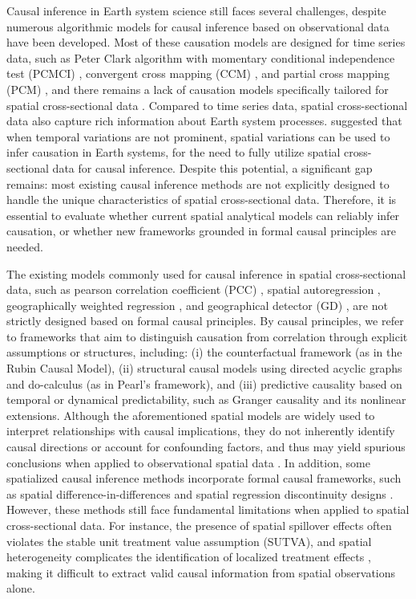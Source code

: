\documentclass[authoryear,preprint,review,12pt]{elsarticle}
\begin{document}
Causal inference in Earth system science still faces several challenges, despite numerous algorithmic models for causal inference based on observational data have been developed. Most of these causation models are designed for time series data, such as Peter Clark algorithm with momentary conditional independence test (PCMCI) \citep{runge2019pcmci}, convergent cross mapping (CCM) \citep{sugihara2012ccm}, and partial cross mapping (PCM) \citep{leng2020pcm}, and there remains a lack of causation models specifically tailored for spatial cross-sectional data \citep{gao2022ciss,gao2023gccm}. Compared to time series data, spatial cross-sectional data also capture rich information about Earth system processes. \cite{gao2022tscess} suggested that when temporal variations are not prominent, spatial variations can be used to infer causation in Earth systems, for the need to fully utilize spatial cross-sectional data for causal inference. Despite this potential, a significant gap remains: most existing causal inference methods are not explicitly designed to handle the unique characteristics of spatial cross-sectional data. Therefore, it is essential to evaluate whether current spatial analytical models can reliably infer causation, or whether new frameworks grounded in formal causal principles are needed.

The existing models commonly used for causal inference in spatial cross-sectional data, such as pearson correlation coefficient (PCC) \citep{pearson1895pcc}, spatial autoregression \citep{anselin2013sar}, geographically weighted regression \citep{fotheringham2003gwr,fotheringham2017mgwr}, and geographical detector (GD) \citep{wang2010gd1,lyu2025gdverse}, are not strictly designed based on formal causal principles. By causal principles, we refer to frameworks that aim to distinguish causation from correlation through explicit assumptions or structures, including: (i) the counterfactual framework (as in the Rubin Causal Model), (ii) structural causal models using directed acyclic graphs and do-calculus (as in Pearl’s framework), and (iii) predictive causality based on temporal or dynamical predictability, such as Granger causality and its nonlinear extensions. Although the aforementioned spatial models are widely used to interpret relationships with causal implications, they do not inherently identify causal directions or account for confounding factors, and thus may yield spurious conclusions when applied to observational spatial data \citep{gao2022ciss}. In addition, some spatialized causal inference methods incorporate formal causal frameworks, such as spatial difference-in-differences \citep{delgado2015sdid} and spatial regression discontinuity designs \citep{kolak2019srdd}. However, these methods still face fundamental limitations when applied to spatial cross-sectional data. For instance, the presence of spatial spillover effects often violates the stable unit treatment value assumption (SUTVA), and spatial heterogeneity complicates the identification of localized treatment effects \citep{akbari2021spatialcausality,gao2023gccm}, making it difficult to extract valid causal information from spatial observations alone.
\end{document}
